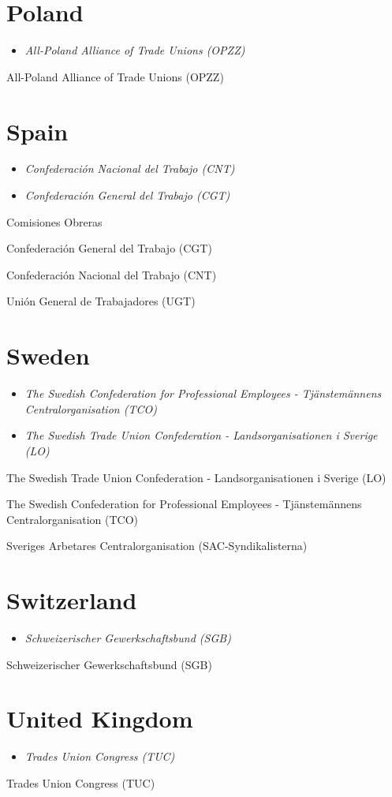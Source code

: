 \section{Poland}\label{poland}

\begin{itemize}
\item
  \emph{All-Poland Alliance of Trade Unions (OPZZ)}
\end{itemize}

All-Poland Alliance of Trade Unions (OPZZ)

\section{Spain}\label{spain}

\begin{itemize}
\item
  \emph{Confederación Nacional del Trabajo (CNT)}
\item
  \emph{Confederación General del Trabajo (CGT)}
\end{itemize}

Comisiones Obreras

Confederación General del Trabajo (CGT)

Confederación Nacional del Trabajo (CNT)

Unión General de Trabajadores (UGT)

\section{Sweden}\label{sweden}

\begin{itemize}
\item
  \emph{The Swedish Confederation for Professional Employees -
  Tjänstemännens Centralorganisation (TCO)}
\item
  \emph{The Swedish Trade Union Confederation - Landsorganisationen i
  Sverige (LO)}
\end{itemize}

The Swedish Trade Union Confederation - Landsorganisationen i Sverige
(LO)

The Swedish Confederation for Professional Employees - Tjänstemännens
Centralorganisation (TCO)

Sveriges Arbetares Centralorganisation (SAC-Syndikalisterna)

\section{Switzerland}\label{switzerland}

\begin{itemize}
\item
  \emph{Schweizerischer Gewerkschaftsbund (SGB)}
\end{itemize}

Schweizerischer Gewerkschaftsbund (SGB)

\section{United Kingdom}\label{united-kingdom}

\begin{itemize}
\item
  \emph{Trades Union Congress (TUC)}
\end{itemize}

Trades Union Congress (TUC)
